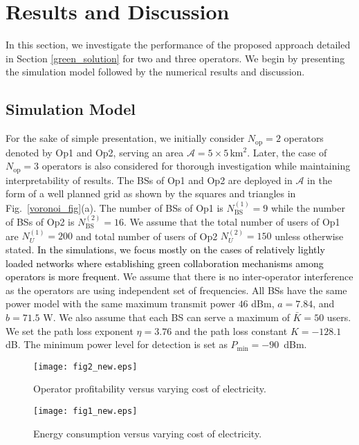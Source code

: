 \documentclass[10pt, letter, twocolumn]{IEEEtran}
\begin{document}
\section{Results and Discussion}\label{sec7}
In this section, we investigate the performance of the proposed approach detailed in Section \ref{green_solution} for two and three operators. We begin by presenting the simulation model followed by the numerical results and discussion.
\subsection{Simulation Model} \label{simulation_model_sec}
For the sake of simple presentation, we initially consider $N_{\text{op}}=2$ operators denoted by Op1 and Op2, serving an area $\mathcal{A} = 5\times 5\, $km$^2$. Later, the case of $N_{\text{op}}=3$ operators is also considered for thorough investigation while maintaining interpretability of results. The BSs of Op1 and Op2 are deployed in $\mathcal{A}$ in the form of a well planned grid as shown by the squares and triangles in Fig.~\ref{voronoi_fig}(a). The number of BSs of Op1 is $N_{\mathrm{BS}}^{(1)}=9$ while the number of BSs of Op2 is $N_{\mathrm{BS}}^{(2)}=16$. We assume that the total number of users of Op1 are $N_{U}^{(1)} = 200$ and total number of users of Op2 $N_{U}^{(2)} = 150$ unless otherwise stated. \textcolor{black}{In the simulations, we focus mostly on the cases of relatively lightly loaded networks where establishing green collaboration mechanisms among operators is more frequent.} We assume that there is no inter-operator interference as the operators are using independent set of frequencies. All BSs have the same power model with the same maximum transmit power $46$ dBm, $a=7.84$, and $b=71.5$ W. We also assume that each BS can serve a maximum of $\bar{K}=50$ users. We set the path loss exponent $\eta=3.76$ and the path loss constant $K=-128.1$ dB. The minimum power level for detection is set as $P_{\text{min}} = -90$~dBm.

\begin{figure}[t!]
  \centering
  \texttt{[image: fig2\_new.eps]}
  \caption{Operator profitability versus varying cost of electricity.}\label{fig2_new}
\end{figure}
\begin{figure}[t!]
  \centering
  \texttt{[image: fig1\_new.eps]}
  \caption{Energy consumption versus varying cost of electricity.}\label{fig1_new}
\end{figure}
\end{document}
